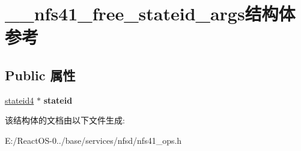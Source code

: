 \hypertarget{struct____nfs41__free__stateid__args}{}\section{\+\_\+\+\_\+nfs41\+\_\+free\+\_\+stateid\+\_\+args结构体 参考}
\label{struct____nfs41__free__stateid__args}
\subsection*{Public 属性}
\begin{DoxyCompactItemize}
\item 
\mbox{\label{struct____nfs41__free__stateid__args_a9ef32af232efe15d5144cad9a602a825}} 
\hyperlink{struct____stateid4}{stateid4} $\ast$ {\bfseries stateid}
\end{DoxyCompactItemize}


该结构体的文档由以下文件生成\+:\begin{DoxyCompactItemize}
\item 
E\+:/\+React\+O\+S-\/0../base/services/nfsd/nfs41\+\_\+ops.\+h\end{DoxyCompactItemize}

